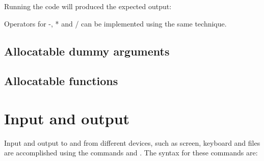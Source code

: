Running the code will produced the expected output:

\cmdmode


\fmode

Operators for -, * and / can be implemented using the same technique.

\subsection{Allocatable dummy arguments}


\subsection{Allocatable functions}



%
%
%

\section{Input and output}

Input and output to and from different devices, such as screen, keyboard and files are accomplished using the commands  and . The syntax for these commands are:

